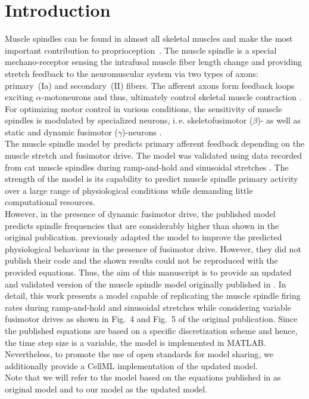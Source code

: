 \documentclass[fleqn,10pt]{physiome}
\begin{document}
\section{Introduction}
Muscle spindles can be found in almost all skeletal muscles and make the most important contribution to proprioception~\citep{macefield2018}. The muscle spindle is a special mechano-receptor sensing the intrafusal muscle fiber length change and providing stretch feedback to the neuromuscular system via two types of axons: primary~(Ia) and secondary~(II) fibers.
The afferent axons form feedback loops exciting $\alpha$-motoneurons and thus, ultimately control skeletal muscle contraction \citep{kandel2000}. 
For optimizing motor control in various conditions, the sensitivity of muscle spindles is modulated by specialized neurons, i.\,e. skeletofusimotor ($\beta$)- as well as static and dynamic fusimotor ($\gamma$)-neurons \citep{banks1994,matthews1962}. \\
The muscle spindle model by \citet{maltenfort2003} predicts primary afferent feedback depending on the muscle stretch and fusimotor drive. The model was validated using data recorded from cat muscle spindles during ramp-and-hold and sinusoidal stretches \citep{crowe1964,hulliger1977a,hulliger1977b}. 
The strength of the model is its capability to predict muscle spindle primary activity over a large range of physiological conditions while demanding little computational resources.\\
However, in the presence of dynamic fusimotor drive, the published model predicts spindle frequencies that are considerably higher than shown in the original publication.  
\citet{grandjean2014} previously adapted the \citet{maltenfort2003} model to improve the predicted physiological behaviour in the presence of fusimotor drive. However, they did not publish their code and the shown results could not be reproduced with the provided equations.
Thus, the aim of this manuscript is to provide an updated and validated version of the muscle spindle model originally published in \citet{maltenfort2003}.
In detail, this work presents a model capable of replicating the muscle spindle firing rates during ramp-and-hold and sinusoidal stretches while considering variable fusimotor drives as shown in Fig.~4 and Fig.~5 of the original publication. 
Since the published equations are based on a specific discretization scheme and hence, the time step size is a variable, the model is implemented in MATLAB. 
Nevertheless, to promote the use of open standards for model sharing, we additionally provide a CellML implementation of the updated model. \\
Note that we will refer to the model based on the equations published in \citet{maltenfort2003} as original model and to our model as the updated model. 
\end{document}
